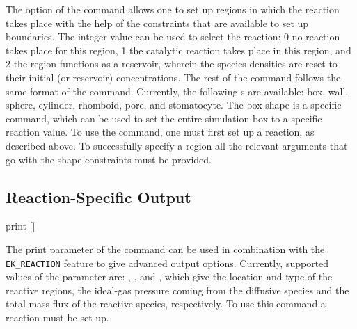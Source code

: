 \begin{essyntax}
  \begin{features}
  \end{features}
\end{essyntax}
The  option of the  command allows one 
to set up regions in which the reaction takes place with the help of the 
constraints that are available to set up boundaries. The integer value 
 can be used to select the reaction: 0 no reaction takes
place for this region, 1 the catalytic reaction takes place in this region, and 
2 the region functions as a reservoir, wherein the species densities are reset
to their initial (or reservoir) concentrations. The rest of the command follows 
the same format of the  command. Currently, the 
following s are available: box, wall, sphere, cylinder, rhomboid, 
pore, and stomatocyte. The box shape is a  specific command, which
can be used to set the entire simulation box to a specific reaction value. To
use the  command, one must first set up
a reaction, as described above. To successfully specify a region all the 
relevant arguments that go with the shape constraints must be provided.

\subsection{\label{ssec:ek-reac-output}Reaction-Specific Output}

\begin{essyntax}
  print 
   []
  \begin{features}
  \end{features}
\end{essyntax}
The print parameter of the  command can be used in
combination with the \texttt{EK\_REACTION} feature to give advanced output 
options. Currently, supported values of the parameter  are: 
, , and , which give the 
location and type of the reactive regions, the ideal-gas pressure coming from 
the diffusive species and the total mass flux of the reactive species,
respectively. To use this command a reaction must be set up.

